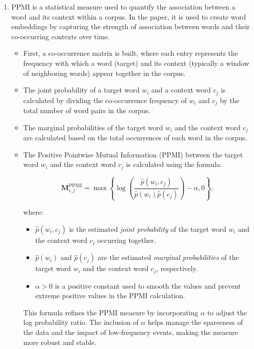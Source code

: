 \begin{enumerate}
    \item
{}
PPMI is a statistical measure used to quantify the association between a word and its context within a corpus.
In the paper, it is used to create word embeddings by capturing the strength of association between words and their co-occurring contexts over time.

\begin{itemize}
    \item {}
    First, a co-occurrence matrix is built, where each entry represents the frequency with which a word (target) and its context (typically a window of neighboring words) appear together in the corpus.
    \item {}
    The joint probability of a target word $w_i$ and a context word $c_j$ is calculated by dividing the co-occurrence frequency of $w_i$ and $c_j$ by the total number of word pairs in the corpus.
    \item {}
    The marginal probabilities of the target word $w_i$ and the context word $c_j$ are calculated based on the total occurrences of each word in the corpus.
    \item {}
    The Positive Pointwise Mutual Information (PPMI) between the target word $w_i$ and the context word $c_j$ is calculated using the formula:

    \begin{equation}
    \mathbf{M}^{\text{PPMI}}_{i,j} = \max \left\{ \log \left( \frac{\hat{p}(w_i, c_j)}{\hat{p}(w_i) \hat{p}(c_j)} \right) - \alpha, 0 \right\},
    \label{eq:ppmi}
    \end{equation}

    where:
    \begin{itemize}
    \item $\hat{p}(w_i, c_j)$ is the estimated \emph{joint probability} of the target word $w_i$ and the context word $c_j$ occurring together.
    \item $\hat{p}(w_i)$ and $\hat{p}(c_j)$ are the estimated \emph{marginal probabilities} of the target word $w_i$ and the context word $c_j$, respectively.
    \item $\alpha > 0$ is a positive constant used to smooth the values and prevent extreme positive values in the PPMI calculation.
    \end{itemize}
    This formula refines the PPMI measure by incorporating $\alpha$ to adjust the log probability ratio.
    The inclusion of $\alpha$ helps manage the sparseness of the data and the impact of low-frequency events, making the measure more robust and stable.
\end{itemize}


\end{enumerate}
